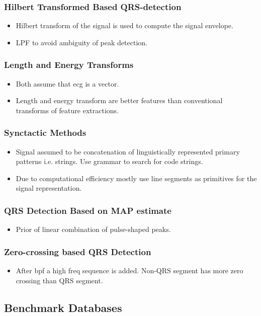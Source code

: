 \documentclass{article}
\begin{document}
\subsubsection{Hilbert Transformed Based QRS-detection}
\begin{itemize}
\item Hilbert transform of the signal is used to compute the signal envelope.
\item LPF to avoid ambiguity of peak detection.
\end{itemize}
\subsubsection{Length and Energy Transforms}
\begin{itemize}
\item Both assume that ecg is a vector.
\item Length and energy transform are better features than conventional transforms of feature extractions.
\end{itemize}
\subsubsection{Synctactic Methods}
\begin{itemize}
\item Signal assumed to be concatenation of linguistically represented primary patterns i.e. strings. Use grammar to search for code strings.
\item Due to computational efficiency mostly use line segments as primitives for the signal representation.
\end{itemize}
\subsubsection{QRS Detection Based on MAP estimate}
\begin{itemize}
\item Prior of linear combination of pulse-shaped peaks.
\end{itemize}
\subsubsection{Zero-crossing based QRS Detection}
\begin{itemize}
\item After bpf a high freq sequence is added. Non-QRS segment has more zero crossing than QRS segment.
\end{itemize}
\subsection{Benchmark Databases}
\end{document}
